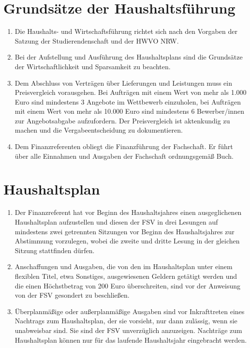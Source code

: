 \documentclass{article}
\begin{document}
\section{Grundsätze der Haushaltsführung}
\begin{enumerate}[(1)]
    \item Die Haushalts- und Wirtschaftsführung richtet sich nach den Vorgaben der Satzung der Studierendenschaft und der HWVO NRW.
    \item Bei der Aufstellung und Ausführung des Haushaltsplans sind die Grundsätze der Wirtschaftlichkeit und Sparsamkeit zu beachten.
    \item Dem Abschluss von Verträgen über Lieferungen und Leistungen muss ein Preisvergleich vorausgehen. Bei Aufträgen mit einem Wert von mehr als 1.000 Euro sind mindestens 3 Angebote im Wettbewerb einzuholen, bei Aufträgen mit einem Wert von mehr als 10.000 Euro sind mindestens 6 Bewerber/innen zur Angebotsabgabe aufzufordern. Der Preisvergleich ist aktenkundig zu machen und die Vergabeentscheidung zu dokumentieren.
    \item Dem Finanzreferenten obliegt die Finanzführung der Fachschaft. Er führt über alle Einnahmen und Ausgaben der Fachschaft ordnungsgemäß Buch.
\end{enumerate}

\section{Haushaltsplan}
\begin{enumerate}[(1)]
    \item Der Finanzreferent hat vor Beginn des Haushaltsjahres einen ausgeglichenen Haushaltsplan aufzustellen und diesen der FSV in drei Lesungen auf mindestens zwei getrennten Sitzungen vor Beginn des Haushaltsjahres zur Abstimmung vorzulegen, wobei die zweite und dritte Lesung in der gleichen Sitzung stattfinden dürfen.
    \item Anschaffungen und Ausgaben, die von den im Haushaltsplan unter einem flexiblen Titel, etwa \glqq Sonstiges\grqq, ausgewiesenen Geldern getätigt werden und die einen Höchstbetrag von 200 Euro überschreiten, sind vor der Anweisung von der FSV gesondert zu beschließen.
    \item Überplanmäßige oder außerplanmäßige Ausgaben sind vor Inkrafttreten eines Nachtrags zum Haushaltsplan, der sie vorsieht, nur dann zulässig, wenn sie unabweisbar sind. Sie sind der FSV unverzüglich anzuzeigen. Nachträge zum Haushaltsplan können nur für das laufende Haushaltsjahr eingebracht werden.
\end{enumerate}
\end{document}
